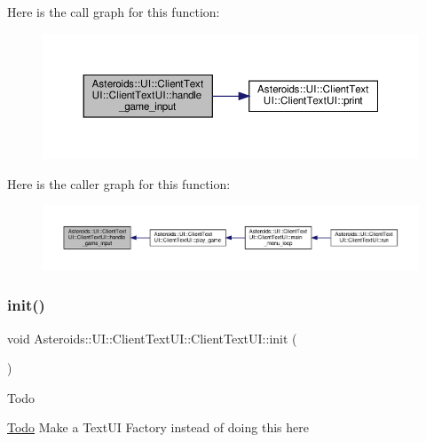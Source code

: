 Here is the call graph for this function\+:
\nopagebreak
\begin{figure}[H]
\begin{center}
\leavevmode
\includegraphics[width=350pt]{classAsteroids_1_1UI_1_1ClientTextUI_1_1ClientTextUI_aaea5f1fccb9aa46a331b15ad2274b319_cgraph}
\end{center}
\end{figure}
Here is the caller graph for this function\+:
\nopagebreak
\begin{figure}[H]
\begin{center}
\leavevmode
\includegraphics[width=350pt]{classAsteroids_1_1UI_1_1ClientTextUI_1_1ClientTextUI_aaea5f1fccb9aa46a331b15ad2274b319_icgraph}
\end{center}
\end{figure}
\mbox{\label{classAsteroids_1_1UI_1_1ClientTextUI_1_1ClientTextUI_af89b843cd3eecc9b5b54cf3067b5fab8}} 
\subsubsection{\texorpdfstring{init()}{init()}}
{\footnotesize\ttfamily void Asteroids\+::\+U\+I\+::\+Client\+Text\+U\+I\+::\+Client\+Text\+U\+I\+::init (\begin{DoxyParamCaption}{ }\end{DoxyParamCaption})\hspace{0.3cm}{\ttfamily [private]}}

\begin{DoxyRefDesc}{Todo}
\item[\hyperlink{todo__todo000021}{Todo}]Make a Text\+UI Factory instead of doing this here \end{DoxyRefDesc}


